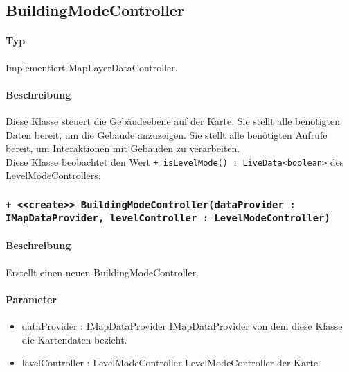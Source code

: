 \subsection{BuildingModeController}
\paragraph*{Typ}
Implementiert MapLayerDataController.
\paragraph*{Beschreibung}
Diese Klasse steuert die Gebäudeebene auf der Karte. Sie stellt alle benötigten Daten bereit, um die Gebäude anzuzeigen. 
Sie stellt alle benötigten Aufrufe bereit, um Interaktionen mit Gebäuden zu verarbeiten.\\
Diese Klasse beobachtet den Wert \texttt{+ isLevelMode() : LiveData<boolean>} des LevelModeControllers.

\subsubsection{\texttt{+ <<create>> BuildingModeController(dataProvider : IMapDataProvider, levelController : LevelModeController)}}%
\paragraph*{Beschreibung}
Erstellt einen neuen BuildingModeController.
\paragraph*{Parameter}
\begin{itemize}
    \item dataProvider : IMapDataProvider IMapDataProvider von dem diese Klasse die Kartendaten bezieht.
    \item levelController : LevelModeController LevelModeController der Karte.
\end{itemize}
